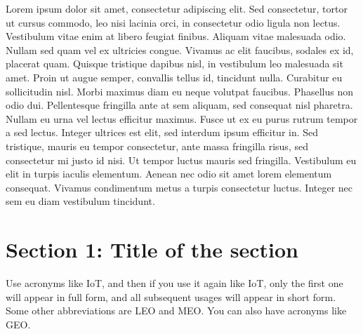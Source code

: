 Lorem ipsum dolor sit amet, consectetur adipiscing elit. Sed consectetur, tortor ut cursus commodo, leo nisi lacinia orci, in consectetur odio ligula non lectus. Vestibulum vitae enim at libero feugiat finibus. Aliquam vitae malesuada odio. Nullam sed quam vel ex ultricies congue. Vivamus ac elit faucibus, sodales ex id, placerat quam. Quisque tristique dapibus nisl, in vestibulum leo malesuada sit amet. Proin ut augue semper, convallis tellus id, tincidunt nulla. Curabitur eu sollicitudin nisl. Morbi maximus diam eu neque volutpat faucibus. Phasellus non odio dui. Pellentesque fringilla ante at sem aliquam, sed consequat nisl pharetra. Nullam eu urna vel lectus efficitur maximus. Fusce ut ex eu purus rutrum tempor a sed lectus. Integer ultrices est elit, sed interdum ipsum efficitur in. Sed tristique, mauris eu tempor consectetur, ante massa fringilla risus, sed consectetur mi justo id nisi. Ut tempor luctus mauris sed fringilla. Vestibulum eu elit in turpis iaculis elementum. Aenean nec odio sit amet lorem elementum consequat. Vivamus condimentum metus a turpis consectetur luctus. Integer nec sem eu diam vestibulum tincidunt.

\section{Section 1: Title of the section} \label{sec:sec1}
Use acronyms like \gls{IoT}, and then if you use it again like \gls{IoT}, only the first one will appear in full form, and all subsequent usages will appear in short form. Some other abbreviations are \gls{LEO} and \gls{MEO}. You can also have acronyms like \gls{GEO}.

